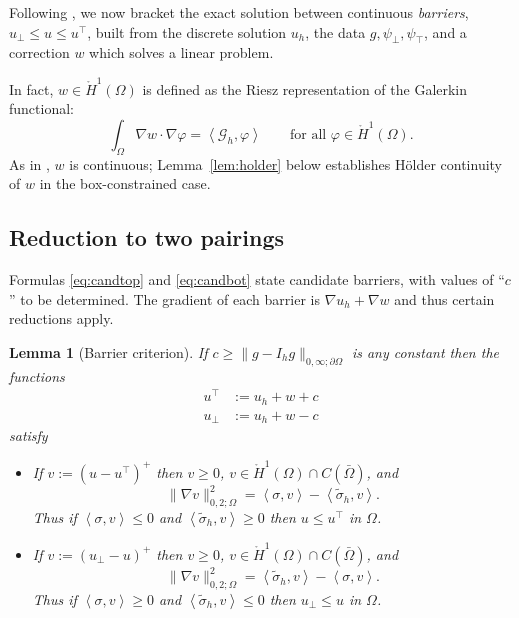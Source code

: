 \documentclass[12pt]{amsart}
\newtheorem{lemma}{Lemma}
\theoremstyle{definition}
\newcommand{\Om}{\Omega}
\newcommand{\dOm}{\partial\Omega}
\newcommand{\Ih}{I_h}
\newcommand{\Gh}{\mathcal{G}_h}
\begin{document}
Following \cite[\S 4]{NSV03}, we now bracket the exact solution between continuous \emph{barriers}, $u_\bot \le u \le u^\top$, built from the discrete solution $u_h$, the data $g,\psi_\bot,\psi_\top$, and a correction $w$ which solves a linear problem.

In fact, $w \in \mathring H^1(\Om)$ is defined as the Riesz representation of the Galerkin functional:
\begin{equation}
\label{eq:w}
  \int_\Om \nabla w \cdot \nabla\varphi = \left<\Gh,\varphi\right> \qquad \text{for all } \varphi \in \mathring H^1(\Om).
\end{equation}
As in \cite[\S 4]{NSV03}, $w$ is continuous; Lemma~\ref{lem:holder} below establishes H\"older continuity of $w$ in the box-constrained case.


\subsection{Reduction to two pairings}

Formulas \eqref{eq:candtop} and \eqref{eq:candbot} state candidate barriers, with values of ``$c$'' to be determined.  The gradient of each barrier is $\nabla u_h + \nabla w$ and thus certain reductions apply.

\begin{lemma}[Barrier criterion]
\label{lem:barriercrit}
If $c \ge \|g - \Ih g\|_{0,\infty;\dOm}$ is any constant then the functions
\begin{align}
u^\top &:= u_h + w + c \label{eq:candtop} \\
u_\bot &:= u_h + w - c \label{eq:candbot}
\end{align}
satisfy
\begin{itemize}
\item[(i)] If $v := (u - u^\top)^+$ then $v \ge 0$, $v \in \mathring H^1(\Om) \cap C(\bar\Om)$, and
\begin{equation}
\label{eq:barrierenergy}
  \|\nabla v\|_{0,2;\Om}^2 = \left<\sigma,v\right> - \left<\tilde\sigma_h,v\right>.
\end{equation}
Thus if $\left<\sigma,v\right> \le 0$ and $\left<\tilde\sigma_h,v\right> \ge 0$ then $u \le u^\top$ in $\Om$.
\item[(ii)] If $v := (u_\bot - u)^+$ then $v \ge 0$, $v \in \mathring H^1(\Om) \cap C(\bar\Om)$, and
\begin{equation}
\|\nabla v\|_{0,2;\Om}^2 = \left<\tilde\sigma_h,v\right> - \left<\sigma,v\right>.
\end{equation}
Thus if $\left<\sigma,v\right> \ge 0$ and $\left<\tilde\sigma_h,v\right> \le 0$ then $u_\bot \le u$ in $\Om$.
\end{itemize}
\end{lemma}
\end{document}
